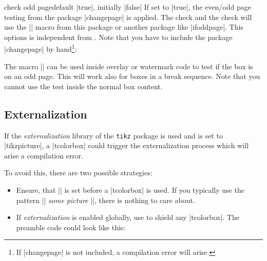 \begin{docTcbKey}{check odd page}{}{default |true|, initially |false|}
If set to |true|, the even/odd page testing from the package |changepage|
is applied. The  check
and the   check
will use the |\ifoddpage| macro from this package or another package like
|ifoddpage|.
This options is independent from .
Note that you have to include the package |changepage| by hand\footnote{If |changepage| is
not included, a compilation error will arise.}:

\begin{dispListing}
\usepackage{changepage}
\strictpagecheck
\end{dispListing}

\medskip
The macro |\ifoddpage| can be used inside overlay or watermark code to test if the
box is on an odd page. This will work also for boxes in a break sequence.
Note that you cannot use the test inside the normal
box content.

\begin{dispExample}

\begin{tcolorbox}[enhanced,check odd page,
  watermark text={\ifoddpage Odd\else Even\fi\ page!}]
\lipsum[1]
\end{tcolorbox}
\end{dispExample}
\end{docTcbKey}


\clearpage
\subsection{Externalization}
If the \emph{externalization} library of the \texttt{tikz} package is used
and  is set to |tikzpicture|,
a |tcolorbox| could trigger the externalization process which will arise
a compilation error.

To avoid this, there are two possible strategies:
\begin{itemize}
\item Ensure, that |\tikzexternaldisable| is set before a |tcolorbox| is used.
  If you typically use the pattern |\tikzexternalenable| \textit{some picture} |\tikzexternaldisable|,
  there is nothing to care about.
\item If \emph{externalization} is enabled globally, use  to
  shield any |tcolorbox|. The preamble code could look like this:
\begin{dispListing}
\usetikzlibrary{external}
\tikzexternalize
{}
\end{dispListing}
\end{itemize}

